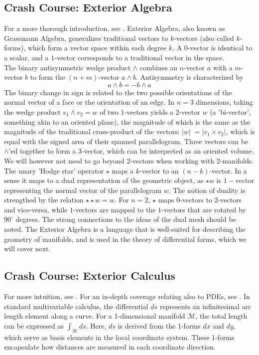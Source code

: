 \subsection*{Crash Course: Exterior Algebra}
For a more thorough introduction, see \cite{craneDDG}.
Exterior Algebra, also known as Grassmann Algebra, generalizes traditional vectors to $k$-vectors (also called $k$-forms), which form a vector space within each degree $k$. A $0$-vector is identical to a scalar, and a $1$-vector corresponds to a traditional vector in the space.
\\
The binary antisymmetric wedge product $\wedge$ combines an $n$-vector $a$ with a $m$-vector $b$ to form the $(n+m)$-vector $a \wedge b$. Antisymmetry is characterized by $$a \wedge b = -b \wedge a$$
The binary change in sign is related to the two possible orientations of the normal vector of a face or the orientation of an edge. In $n=3$ dimensions, taking the wedge product $v_1 \wedge v_2 = w$ of two $1$-vectors yields a $2$-vector $w$ (a 'bi-vector', something akin to an oriented plane), the magnitude of which is the same as the magnitude of the traditional cross-product of the vectors: $|w| \;= |v_1 \times v_2|$, which is equal with the signed area of their spanned parallelogram. Three vectors can be $\wedge$'ed together to form a $3$-vector, which can be interpreted as an oriented volume. We will however not need to go beyond $2$-vectors when working with 2-manifolds.
\\
The unary 'Hodge star' operator $\star$ maps a $k$-vector to an $(n-k)$-vector. In a sense it maps to a dual representation of the geometric object, as $\star w$ is $1-$vector representing the normal vector of the parallelogram $w$. The notion of duality is strengthed by the relation $\star\star w = w$. For $n=2$, $\star$ maps $0$-vectors to $2$-vectors and vice-versa, while $1$-vectors are mapped to the $1$-vectors that are rotated by $90^\circ$ degrees. The strong connections to the ideas of the dual mesh should be noted. The Exterior Algebra is a language that is well-suited for describing the geometry of manifolds, and is used in the theory of differential forms, which we will cover next.

\subsection*{Crash Course: Exterior Calculus}
For more intuition, see \cite{craneDDG}. For an in-depth coverage relating also to PDEs, see \cite{bryant1991exterior}. In standard multivariable calculus, the differential $ds$ represents an infinitesimal arc length element along a curve. For a 1-dimensional manifold $\mathcal{M}$, the total length can be expressed as $\int_{\mathcal{M}} ds$. Here, $ds$ is derived from the 1-forms $dx$ and $dy$, which serve as basis elements in the local coordinate system. These 1-forms encapsulate how distances are measured in each coordinate direction.

